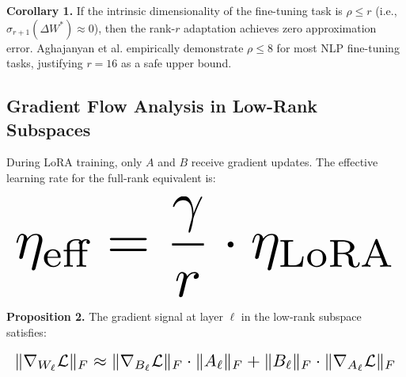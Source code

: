 \documentclass{article}
\begin{document}
\textbf{Corollary 1.} If the intrinsic dimensionality of the fine-tuning task is $\rho \leq r$ (i.e., $\sigma_{r+1}(\Delta W^*) \approx 0$), then the rank-$r$ adaptation achieves zero approximation error. Aghajanyan et al. \cite{arxiv_2208_14227} empirically demonstrate $\rho \leq 8$ for most NLP fine-tuning tasks, justifying $r = 16$ as a safe upper bound.


\subsection{Gradient Flow Analysis in Low-Rank Subspaces}


During LoRA training, only $A$ and $B$ receive gradient updates. The effective learning rate for the full-rank equivalent is:















\begin{equation}
\resizebox{\columnwidth}{!}{$\displaystyle
\begin{aligned}
\eta_{\text{eff}} = \frac{\gamma}{r} \cdot \eta_{\text{LoRA}}
\end{aligned}
$}
\end{equation}















\textbf{Proposition 2.} The gradient signal at layer $\ell$ in the low-rank subspace satisfies:















\begin{equation}
\resizebox{\columnwidth}{!}{$\displaystyle
\begin{aligned}
\|\nabla_{W_\ell}\mathcal{L}\|_F \approx \|\nabla_{B_\ell}\mathcal{L}\|_F \cdot \|A_\ell\|_F + \|B_\ell\|_F \cdot \|\nabla_{A_\ell}\mathcal{L}\|_F
\end{aligned}
$}
\end{equation}
\end{document}
